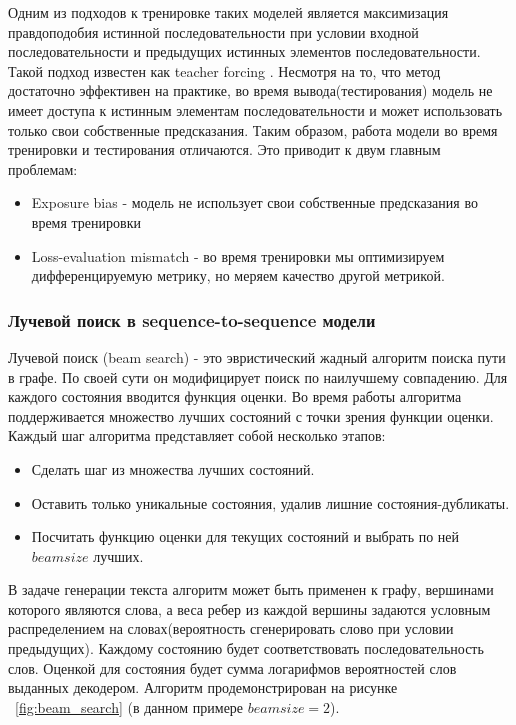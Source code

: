 \documentclass[14pt, a4paper]{extarticle}
\begin{document}
Одним из подходов к тренировке таких моделей является максимизация правдоподобия истинной последовательности при условии входной последовательности и предыдущих
истинных элементов последовательности. Такой подход известен как teacher forcing \cite{teacher_forcing}. Несмотря на то, что метод достаточно
эффективен на практике, во время вывода(тестирования) модель не имеет доступа к истинным элементам последовательности и может использовать только свои собственные предсказания. 
Таким образом, работа модели во время тренировки и тестирования отличаются. Это приводит к двум главным проблемам:
\begin{itemize}
  \item Exposure bias \cite{Ranzato} - модель не использует свои собственные предсказания во время тренировки 
  \item Loss-evaluation mismatch \cite{Wiseman} - во время тренировки мы оптимизируем дифференцируемую метрику, но
  меряем качество другой метрикой. 
\end{itemize}

\subsubsection{Лучевой поиск в sequence-to-sequence модели}
Лучевой поиск (beam search) - это эвристический жадный алгоритм поиска пути в графе. По своей сути
он модифицирует поиск по наилучшему совпадению.
Для каждого состояния вводится функция оценки.
Во время работы алгоритма поддерживается множество лучших состояний с точки зрения функции оценки. Каждый шаг алгоритма представляет собой несколько этапов:
\begin{itemize}
  \item Сделать шаг из множества лучших состояний.
  \item Оставить только уникальные состояния, удалив лишние состояния-дубликаты.
  \item Посчитать функцию оценки для текущих состояний и выбрать по ней $beamsize$ лучших.
\end{itemize}
В задаче генерации текста алгоритм может быть применен к графу, вершинами которого являются слова, а веса ребер из каждой вершины задаются условным распределением на словах(вероятность сгенерировать слово при условии предыдущих).
Каждому состоянию будет соответствовать последовательность слов.
Оценкой для состояния будет сумма логарифмов вероятностей слов выданных декодером.
Алгоритм продемонстрирован на рисунке ~\ref{fig:beam_search} (в данном примере $beamsize=2$).
\end{document}
